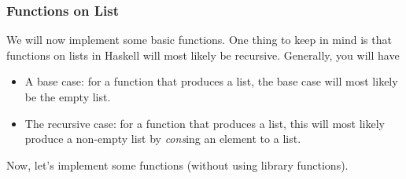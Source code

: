 \documentclass[letterpaper]{article}
\begin{document}
\subsubsection{Functions on List}
We will now implement some basic functions. One thing to keep in mind is that functions on lists in Haskell will most likely be recursive. Generally, you will have 
\begin{itemize}
    \item A base case: for a function that produces a list, the base case will most likely be the empty list. 
    \item The recursive case: for a function that produces a list, this will most likely produce a non-empty list by \emph{cons}ing an element to a list.
\end{itemize}
Now, let's implement some functions (without using library functions).
\end{document}
